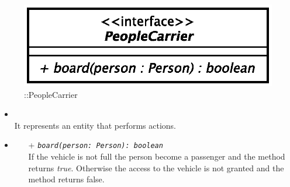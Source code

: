 \begin{figure}[h]
\centering
\includegraphics[scale=0.6,keepaspectratio]{images/solution/app/backend/people_carrier.eps}
\caption{\pActive::PeopleCarrier}
\label{fig:sd-app-people-carrier}
\end{figure}
\FloatBarrier
\begin{itemize}
  \item \textbf{\descr} \\
It represents an entity that performs actions.
  \item \textbf{\ops}
  \begin{itemize}
    \item[+]  \texttt{\textit{board(person: Person): boolean}} \\
If the vehicle is not full the person become a passenger and the method 
returns \textit{true}. Otherwise the access to the vehicle is not granted and 
the method returns false.
  \end{itemize}
\end{itemize}
